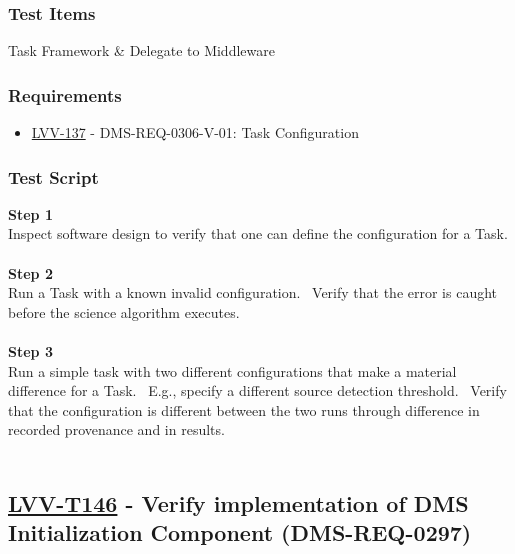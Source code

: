 \hypertarget{test-items-45}{%
\subsubsection{Test Items}\label{test-items-45}}

Task Framework \& Delegate to Middleware

\hypertarget{requirements-45}{%
\subsubsection{Requirements}\label{requirements-45}}

\begin{itemize}
\tightlist
\item
  \href{https://jira.lsstcorp.org/browse/LVV-137}{LVV-137} -
  DMS-REQ-0306-V-01: Task Configuration
\end{itemize}

\hypertarget{test-script-45}{%
\subsubsection{Test Script}\label{test-script-45}}

\textbf{Step 1}\\
Inspect software design to verify that one can define the configuration
for a Task.\\
~\\
\textbf{Step 2}\\
Run a Task with a known invalid configuration. ~Verify that the error is
caught before the science algorithm executes.\\
~\\
\textbf{Step 3}\\
Run a simple task with two different configurations that make a material
difference for a Task. ~E.g., specify a different source detection
threshold. ~Verify that the configuration is different between the two
runs through difference in recorded provenance and in results.\\
~\\

\hypertarget{lvv-t146---verify-implementation-of-dms-initialization-component-dms-req-0297}{%
\subsection{\texorpdfstring{\href{https://jira.lsstcorp.org/secure/Tests.jspa\#/testCase/LVV-T146}{LVV-T146}
- Verify implementation of DMS Initialization Component
(DMS-REQ-0297)}{LVV-T146 - Verify implementation of DMS Initialization Component (DMS-REQ-0297)}}\label{lvv-t146---verify-implementation-of-dms-initialization-component-dms-req-0297}}

